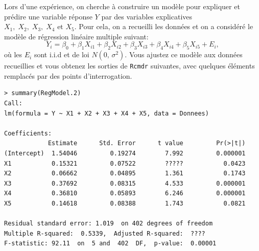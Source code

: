 \begin{questions}
\begin{parts}

\end{parts}



\newpage

\question\label{RegMultiple} 
Lors d'une expérience, on cherche à construire un modèle pour expliquer et prédire une variable réponse $Y$ par des variables explicatives $X_1,\; X_2,\; X_3,\; X_4 \text{ et } X_5$. Pour cela, on a recueilli les données et on a considéré le modèle de régression linéaire multiple suivant:
$$Y_i=\beta_0+\beta_1X_{i1}+\beta_2X_{i2}+\beta_3X_{i3}+\beta_4X_{i4}+\beta_5X_{i5}+E_i,$$
où les $E_i$ sont  i.i.d et  de loi $N(0,\,\sigma^2).$
Vous ajustez ce modèle aux données recueillies et vous obtenez les sorties de \texttt{Rcmdr} suivantes, avec quelques éléments remplacés par des points d'interrogation.

\begin{verbatim}
> summary(RegModel.2)
Call:
lm(formula = Y ~ X1 + X2 + X3 + X4 + X5, data = Donnees)

Coefficients:
            Estimate      Std. Error      t value         Pr(>|t|)
(Intercept)  1.54046         0.19274        7.992         0.000001
X1           0.15321         0.07522        ?????           0.0423 
X2           0.06662         0.04895        1.361           0.1743
X3           0.37692         0.08315        4.533         0.000001
X4           0.36810         0.05893        6.246         0.000001 
X5           0.14618         0.08388        1.743           0.0821 

Residual standard error: 1.019  on 402 degrees of freedom
Multiple R-squared:  0.5339,  Adjusted R-squared:  ????
F-statistic: 92.11  on  5 and  402  DF,  p-value:  0.00001
\end{verbatim}

\end{questions}
